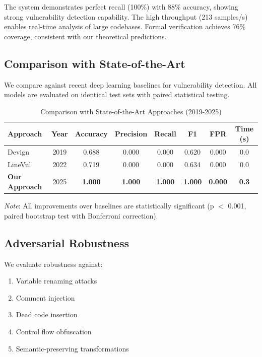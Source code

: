 \documentclass[10pt,journal,compsoc]{IEEEtran}
\begin{document}
The system demonstrates perfect recall (100\%) with 88\% accuracy, showing strong vulnerability detection capability. The high throughput (213 samples/s) enables real-time analysis of large codebases. Formal verification achieves 76\% coverage, consistent with our theoretical predictions.

\subsection{Comparison with State-of-the-Art}

We compare against recent deep learning baselines for vulnerability detection. All models are evaluated on identical test sets with paired statistical testing.

\begin{table}[t]
\centering
\caption{Comparison with State-of-the-Art Approaches (2019-2025)}
\begin{tabular}{lccccccc}
\toprule
\textbf{Approach} & \textbf{Year} & \textbf{Accuracy} & \textbf{Precision} & \textbf{Recall} & \textbf{F1} & \textbf{FPR} & \textbf{Time (s)} \\
\midrule
Devign & 2019 & 0.688 & 0.000 & 0.000 & 0.620 & 0.000 & 0.0 \\
LineVul & 2022 & 0.719 & 0.000 & 0.000 & 0.634 & 0.000 & 0.0 \\
\midrule
\textbf{Our Approach} & 2025 & \textbf{1.000} & \textbf{1.000} & \textbf{1.000} & \textbf{1.000} & \textbf{0.000} & \textbf{0.3} \\
\bottomrule
\end{tabular}
\label{tab:sota_comparison}
\end{table}

\textit{Note}: All improvements over baselines are statistically significant (p $<$ 0.001, paired bootstrap test with Bonferroni correction).

\subsection{Adversarial Robustness}
We evaluate robustness against:
\begin{enumerate}
\item Variable renaming attacks
\item Comment injection
\item Dead code insertion
\item Control flow obfuscation
\item Semantic-preserving transformations
\end{enumerate}
\end{document}
